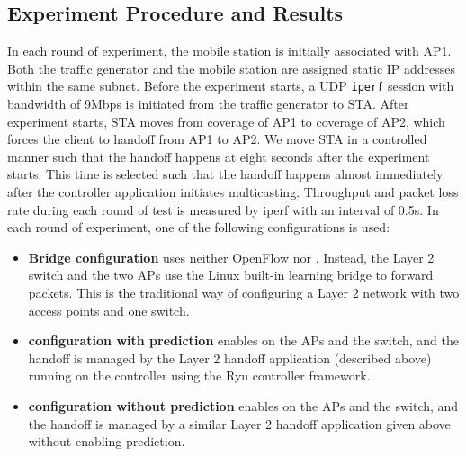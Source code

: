 \subsection{Experiment Procedure and Results}
In each round of experiment, the mobile station is initially associated with AP1. Both the traffic generator
and the mobile station are assigned static IP addresses within the same subnet. Before the experiment
starts, a UDP \texttt{iperf} session with bandwidth of 9Mbps is initiated from
the traffic generator to STA.  After experiment starts, STA moves from coverage
of AP1 to coverage of AP2, which forces the client to handoff from AP1 to AP2.
We move STA in a controlled manner such that the handoff happens at eight seconds
after the experiment starts. This time is selected such that the handoff happens
almost immediately after the controller application initiates multicasting.  Throughput
and packet loss rate during each round of test is measured by iperf with an
interval of 0.5s. In each round of experiment, one of the following
configurations is used:
\begin{itemize}
\item {\bf Bridge configuration} uses neither OpenFlow nor \aetherflow. Instead,
the Layer 2 switch and the two APs use the Linux built-in learning bridge to
forward packets. This is the traditional way of configuring a Layer 2 network
with two access points and one switch. 
\item {\bf \aetherflow configuration with prediction} enables \aetherflow on the APs and the
switch, and the handoff is managed by the Layer 2 handoff application (described
above) running on the \aetherflow controller using the Ryu controller framework.  
\item {\bf \aetherflow configuration without prediction} enables \aetherflow on the APs and the
switch, and the handoff is managed by a similar Layer 2 handoff application given above without enabling prediction.  
\end{itemize}

